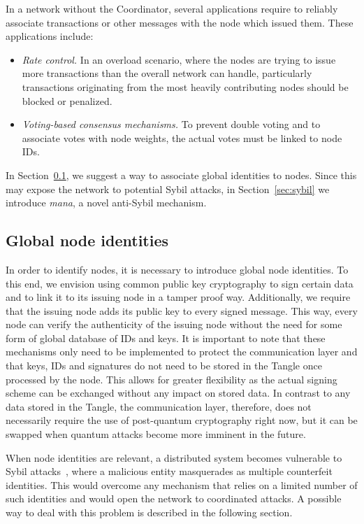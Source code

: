\documentclass[../main.tex]{subfiles}
\begin{document}
In a network without the Coordinator, several applications require to reliably associate transactions or other messages with the node which issued them.
These applications include:

\begin{itemize}
    \item \textit{Rate control.}
    In an overload scenario, where the nodes are trying to issue more transactions than the overall network can handle, particularly transactions originating from the most heavily contributing nodes should be blocked or penalized.
    \item \textit{Voting-based consensus mechanisms.}
    To prevent double voting and to associate votes with node weights, the actual votes must be linked to node IDs.
\end{itemize}

In Section~\ref{sec:global-node-id}, we suggest a way to associate global identities to nodes. Since this may expose the network to potential Sybil attacks, in Section~\ref{sec:sybil} we introduce \textit{mana}, a novel anti-Sybil mechanism. 

\subsection{Global node identities}\label{sec:global-node-id}

In order to identify nodes, it is necessary to introduce global node identities.
To this end, we envision using common public key cryptography to sign certain data and to link it to its issuing node in a tamper proof way.
Additionally, we require that the issuing node adds its public key to every signed message.
This way, every node can verify the authenticity of the issuing node without the need for some form of global database of IDs and keys.
It is important to note that these mechanisms only need to be implemented to protect the communication layer and that keys, IDs and signatures do not need to be stored in the Tangle once processed by the node.
This allows for greater flexibility as the actual signing scheme can be exchanged without any impact on stored data.
In contrast to any data stored in the Tangle, the communication layer, therefore, does not necessarily require the use of post-quantum cryptography right now, but it can be swapped when quantum attacks become more imminent in the future.

When node identities are relevant, a distributed system becomes vulnerable to Sybil attacks~\cite{douceur2002}, where a malicious entity masquerades as multiple counterfeit identities.
This would overcome any mechanism that relies on a limited number of such identities and would open the network to coordinated attacks. A possible way to deal with this problem is described in the following section.
\end{document}
